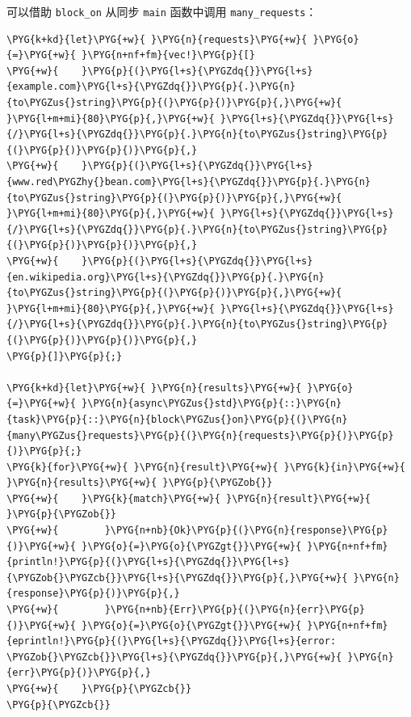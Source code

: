 可以借助 \texttt{block\_on} 从同步 \texttt{main} 函数中调用 \texttt{many\_requests}：

\begin{Verbatim}[commandchars=\\\{\},breaklines=true,breakanywhere=true,fontsize=\codefont,xleftmargin=17bp]
\PYG{k+kd}{let}\PYG{+w}{ }\PYG{n}{requests}\PYG{+w}{ }\PYG{o}{=}\PYG{+w}{ }\PYG{n+nf+fm}{vec!}\PYG{p}{[}
\PYG{+w}{    }\PYG{p}{(}\PYG{l+s}{\PYGZdq{}}\PYG{l+s}{example.com}\PYG{l+s}{\PYGZdq{}}\PYG{p}{.}\PYG{n}{to\PYGZus{}string}\PYG{p}{(}\PYG{p}{)}\PYG{p}{,}\PYG{+w}{      }\PYG{l+m+mi}{80}\PYG{p}{,}\PYG{+w}{ }\PYG{l+s}{\PYGZdq{}}\PYG{l+s}{/}\PYG{l+s}{\PYGZdq{}}\PYG{p}{.}\PYG{n}{to\PYGZus{}string}\PYG{p}{(}\PYG{p}{)}\PYG{p}{)}\PYG{p}{,}
\PYG{+w}{    }\PYG{p}{(}\PYG{l+s}{\PYGZdq{}}\PYG{l+s}{www.red\PYGZhy{}bean.com}\PYG{l+s}{\PYGZdq{}}\PYG{p}{.}\PYG{n}{to\PYGZus{}string}\PYG{p}{(}\PYG{p}{)}\PYG{p}{,}\PYG{+w}{ }\PYG{l+m+mi}{80}\PYG{p}{,}\PYG{+w}{ }\PYG{l+s}{\PYGZdq{}}\PYG{l+s}{/}\PYG{l+s}{\PYGZdq{}}\PYG{p}{.}\PYG{n}{to\PYGZus{}string}\PYG{p}{(}\PYG{p}{)}\PYG{p}{)}\PYG{p}{,}
\PYG{+w}{    }\PYG{p}{(}\PYG{l+s}{\PYGZdq{}}\PYG{l+s}{en.wikipedia.org}\PYG{l+s}{\PYGZdq{}}\PYG{p}{.}\PYG{n}{to\PYGZus{}string}\PYG{p}{(}\PYG{p}{)}\PYG{p}{,}\PYG{+w}{ }\PYG{l+m+mi}{80}\PYG{p}{,}\PYG{+w}{ }\PYG{l+s}{\PYGZdq{}}\PYG{l+s}{/}\PYG{l+s}{\PYGZdq{}}\PYG{p}{.}\PYG{n}{to\PYGZus{}string}\PYG{p}{(}\PYG{p}{)}\PYG{p}{)}\PYG{p}{,}
\PYG{p}{]}\PYG{p}{;}

\PYG{k+kd}{let}\PYG{+w}{ }\PYG{n}{results}\PYG{+w}{ }\PYG{o}{=}\PYG{+w}{ }\PYG{n}{async\PYGZus{}std}\PYG{p}{::}\PYG{n}{task}\PYG{p}{::}\PYG{n}{block\PYGZus{}on}\PYG{p}{(}\PYG{n}{many\PYGZus{}requests}\PYG{p}{(}\PYG{n}{requests}\PYG{p}{)}\PYG{p}{)}\PYG{p}{;}
\PYG{k}{for}\PYG{+w}{ }\PYG{n}{result}\PYG{+w}{ }\PYG{k}{in}\PYG{+w}{ }\PYG{n}{results}\PYG{+w}{ }\PYG{p}{\PYGZob{}}
\PYG{+w}{    }\PYG{k}{match}\PYG{+w}{ }\PYG{n}{result}\PYG{+w}{ }\PYG{p}{\PYGZob{}}
\PYG{+w}{        }\PYG{n+nb}{Ok}\PYG{p}{(}\PYG{n}{response}\PYG{p}{)}\PYG{+w}{ }\PYG{o}{=}\PYG{o}{\PYGZgt{}}\PYG{+w}{ }\PYG{n+nf+fm}{println!}\PYG{p}{(}\PYG{l+s}{\PYGZdq{}}\PYG{l+s}{\PYGZob{}\PYGZcb{}}\PYG{l+s}{\PYGZdq{}}\PYG{p}{,}\PYG{+w}{ }\PYG{n}{response}\PYG{p}{)}\PYG{p}{,}
\PYG{+w}{        }\PYG{n+nb}{Err}\PYG{p}{(}\PYG{n}{err}\PYG{p}{)}\PYG{+w}{ }\PYG{o}{=}\PYG{o}{\PYGZgt{}}\PYG{+w}{ }\PYG{n+nf+fm}{eprintln!}\PYG{p}{(}\PYG{l+s}{\PYGZdq{}}\PYG{l+s}{error: \PYGZob{}\PYGZcb{}}\PYG{l+s}{\PYGZdq{}}\PYG{p}{,}\PYG{+w}{ }\PYG{n}{err}\PYG{p}{)}\PYG{p}{,}
\PYG{+w}{    }\PYG{p}{\PYGZcb{}}
\PYG{p}{\PYGZcb{}}
\end{Verbatim}


